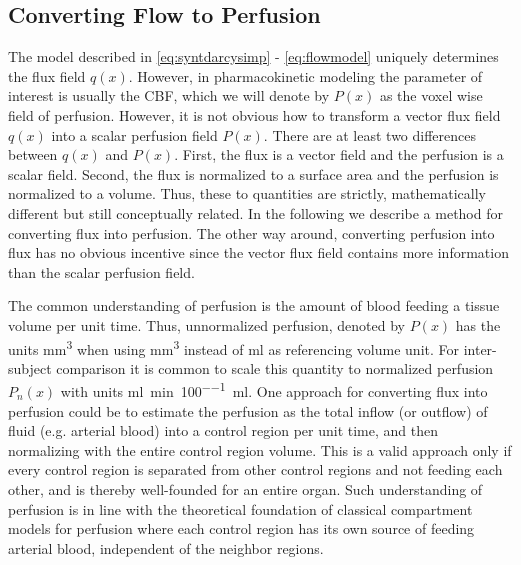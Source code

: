 \documentclass[paper=a4, fontsize=11pt,parskip=half,headings=small]{scrartcl}
\newcommand{\siPn}{\milli\litre\per\minute\per100\milli\litre}
\newcommand{\simm}{\milli\meter\cubed}
\newcommand{\siml}{\milli\litre}
\begin{document}
	\subsection{Converting Flow to Perfusion}\label{sec:flux2perf}
	The model described in \eqref{eq:syntdarcysimp} - \eqref{eq:flowmodel} uniquely determines the flux field $q(x)$. 
	However, in pharmacokinetic modeling the parameter of interest is usually the CBF, which we will denote by $P(x)$ as the voxel wise field of perfusion. However, 
	it is not obvious how to transform a vector flux field $q(x)$ into a scalar perfusion field $P(x)$.
	There are at least two differences between $q(x)$ and $P(x)$. 
	First, the flux is a vector field and the perfusion is a scalar field. 
	Second, the flux is normalized to a surface area and the perfusion is normalized to a volume. 
	Thus, these to quantities are strictly, mathematically different but still conceptually related. 
	In the following we describe a method for converting flux into perfusion. The other way around, converting perfusion into flux has no obvious incentive since the vector flux field contains more information than the scalar perfusion field.

	The common understanding of perfusion is the amount of blood feeding a tissue volume per unit time. 
	Thus, unnormalized perfusion, denoted by $P(x)$ has the units \si{\simm} when using \si{\simm} instead of \si{\siml} as referencing volume unit.
	For inter-subject comparison it is common to scale this quantity to normalized perfusion $P_n(x)$ with units \si{\siPn}. 
	One approach for converting flux into perfusion could be to estimate the perfusion as the total inflow (or outflow) of fluid (e.g. arterial blood) into a control region per unit time, and then normalizing with the entire control region volume. 
	This is a valid approach only if every control region is separated from other control regions and not feeding each other, and is thereby well-founded 
	for an entire organ. 
	Such understanding of perfusion is in line with the theoretical foundation of classical compartment models for perfusion where each control region has its own source of feeding arterial blood, independent of the neighbor regions. 
	
\end{document}
